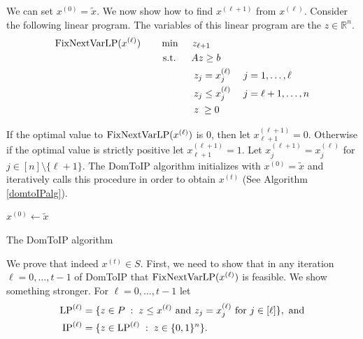 We can set $x^{(0)}=\tilde{x}$. We now show how to find $x^{(\ell+1)}$ from $x^{(\ell)}$. Consider the following linear program. The variables of this linear program are the $z\in \mathbb{R}^n$.
\begin{align}
\HelperLP(x^{(\ell)})\quad\quad& \min\quad \;z_{\ell+1}\\
&\;\text{s.t.} \quad \;\;Az\geq b \\
&\;{\color{white}{\text{s.t.}} }\quad \;\; \; z_j = x^{(\ell)}_j \quad \; j =1,\ldots, \ell\\
&\;{\color{white}{\text{s.t.}} }\quad \; \;\; z_j \leq x^{(\ell)}_j \quad \; j = \ell+1,\ldots,n\\
&\;{\color{white}{\text{s.t.}} }\quad \; \;\; z\;\geq 0
\end{align}

If the optimal value to $\operatorname{{{FixNextVarLP}}}(x^{(\ell)})$ is 0, then let $x^{(\ell+1)}_{\ell+1} = 0$. Otherwise if the optimal value is strictly positive let $x^{(\ell+1)}_{\ell+1} = 1$. Let $x^{(\ell+1)}_j = x^{(\ell)}_j$ for $j\in [n]\setminus \{\ell+1\}$. The DomToIP algorithm initializes with $x^{(0)}=\tilde{x}$ and iteratively calls this procedure in order to obtain $x^{(t)}$ (See Algorithm \ref{domtoIPalg}).

\vspace*{10pt}
\begin{algorithm}[h]
	$x^{(0)}\leftarrow \tilde{x}$\\
	\caption{The DomToIP algorithm}
	\label{domtoIPalg}
\end{algorithm}
\vspace*{10pt}

We prove that indeed $x^{(t)}\in S$. First, we need to show that in any iteration $\ell=  0,\ldots,t-1$ of DomToIP that $\operatorname{{{FixNextVarLP}}}(x^{(\ell)})$ is feasible. We show something stronger. For $\ell=0,\ldots,t-1$ let
\begin{align*}
\operatorname{LP}^{(\ell)}&= \{z\in P\; : \; z\leq x^{(\ell)} \mbox{ and } z_j=x_j^{(\ell)} \mbox{ for } j\in [\ell]\}, \text{ and}\\
\operatorname{IP}^{(\ell)}&= \{z\in \operatorname{LP}^{(\ell)}\; : \; z\in \{0,1\}^n\}.
\end{align*}


